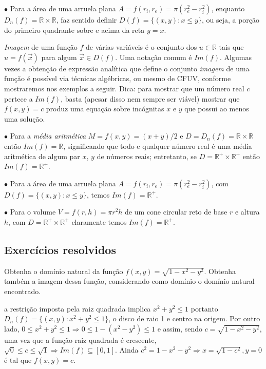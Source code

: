 \medskip

$\bullet $ Para a área de uma arruela plana $A = f(r_i,r_e) = \pi (r_e^2 - r_i^2)$, enquanto $D_n(f) = \mathbb{R} \times \mathbb{R}$, faz sentido definir $D(f) = \{(x,y): x \leq y \}$, ou seja, a porção do primeiro quadrante sobre e acima da reta $y=x$.

\medskip

{\it Imagem} de uma função $f$ de várias variáveis é o conjunto dos $u \in \mathbb{R}$ tais que $u=f(\vec{x})$ para algum $\vec{x} \in D(f)$. Uma notação comum é $Im(f)$. Algumas vezes a obtenção de expressão analítica que define o conjunto {\it imagem} de uma função é possível via técnicas algébricas, ou mesmo de CFUV, conforme mostraremos nos exemplos a seguir. Dica: para mostrar que um número real $c$ pertece a $Im(f)$, basta (apesar disso nem sempre ser viável) mostrar que $f(x,y)=c$ produz uma equação sobre incógnitas $x$ e $y$ que possui ao menos uma solução.

\medskip

$\bullet$ Para a {\it média aritmética} $M=f(x,y)=(x+y)/2$ e $D=D_n(f) = \mathbb{R} \times \mathbb{R}$ então $Im(f) = \mathbb{R}$, significando que todo e qualquer número real é uma média aritmética de algum par $x$, $y$ de números reais; entretanto, se $D = \mathbb{R}^{+} \times \mathbb{R}^{+}$ então $Im(f)=\mathbb{R}^{+}$.

\medskip


$\bullet $ Para a área de uma arruela plana $A = f(r_i,r_e) = \pi (r_e^2 - r_i^2)$, com $D(f) = \{(x,y): x \leq y \}$, temos $Im(f) = \mathbb{R}^{+}$.

\medskip

$\bullet$ Para o volume  $V=f(r,h)=\pi r^2h$ de um cone circular reto de base $r$ e altura $h$, com $D = \mathbb{R}^{+} \times \mathbb{R}^{+}$ claramente temos $Im(f) = \mathbb{R}^{+}$.

\subsection*{Exercícios resolvidos} 

\begin{exeresol}
Obtenha o domínio natural da função $f(x,y) = \sqrt{1-x^2 -y^2}$. Obtenha também a imagem dessa função, considerando como domínio o domínio natural encontrado.
\end{exeresol}
\begin{resol}
a restrição imposta pela raiz quadrada implica $x^2 + y^2 \leq 1$ portanto $D_n(f) = \{ (x,y) : x^2 + y^2 \leq 1\}$, o disco de raio 1 e centro na origem. Por outro lado, $0 \leq x^2 + y^2 \leq 1 \Rightarrow 0 \leq 1-(x^2-y^2) \leq 1$ e assim, sendo $c=\sqrt{1-x^2-y^2}$, uma vez que a função raiz quadrada é crescente, $\sqrt{0} \leq c \leq \sqrt{1} \Rightarrow Im(f) \subseteq [0 , 1]$. Ainda $c^2 = 1-x^2-y^2 \Rightarrow x=\sqrt{1-c^2}, y=0$ é tal que $f(x,y)=c$.
\end{resol}

